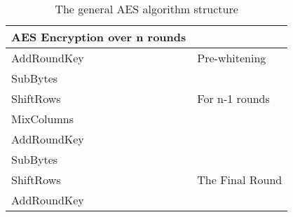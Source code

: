 \documentclass[Report.tex]{subfiles}
\begin{document}
\begin{table}[h]
\begin{center}
    \begin{tabular}{|l|l|}
    \hline
    AES Encryption over n rounds & ~               \\ \hline
    AddRoundKey                  & Pre-whitening   \\ \hline
    SubBytes                     & ~               \\
    ShiftRows                    & For n-1 rounds  \\
    MixColumns                   & ~               \\
    AddRoundKey                  & ~               \\ \hline
    SubBytes                     & ~               \\
    ShiftRows                    & The Final Round \\
    AddRoundKey                  & ~               \\ \hline
    \end{tabular}
    \caption{\label{GEAES}The general AES algorithm structure}
\end{center}
\end{table}
\end{document}
